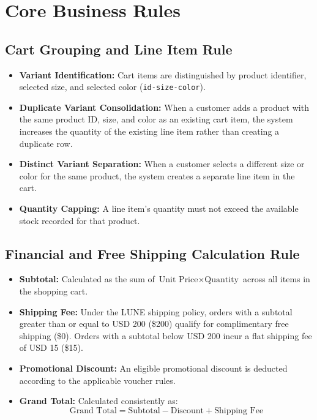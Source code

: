 \documentclass[12pt,a4paper,oneside]{report}
\begin{document}
\section{Core Business Rules}

\subsection{Cart Grouping and Line Item Rule}
\begin{itemize}[leftmargin=1.2cm]
    \item \textbf{Variant Identification:} Cart items are distinguished by product identifier, selected size, and selected color (\texttt{id-size-color}).
    \item \textbf{Duplicate Variant Consolidation:} When a customer adds a product with the same product ID, size, and color as an existing cart item, the system increases the quantity of the existing line item rather than creating a duplicate row.
    \item \textbf{Distinct Variant Separation:} When a customer selects a different size or color for the same product, the system creates a separate line item in the cart.
    \item \textbf{Quantity Capping:} A line item's quantity must not exceed the available stock recorded for that product.
\end{itemize}

\subsection{Financial and Free Shipping Calculation Rule}
\begin{itemize}[leftmargin=1.2cm]
    \item \textbf{Subtotal:} Calculated as the sum of $\text{Unit Price} \times \text{Quantity}$ across all items in the shopping cart.
    \item \textbf{Shipping Fee:} Under the LUNE shipping policy, orders with a subtotal greater than or equal to USD 200 (\$200) qualify for complimentary free shipping (\$0). Orders with a subtotal below USD 200 incur a flat shipping fee of USD 15 (\$15).
    \item \textbf{Promotional Discount:} An eligible promotional discount is deducted according to the applicable voucher rules.
    \item \textbf{Grand Total:} Calculated consistently as:
    \[ \text{Grand Total} = \text{Subtotal} - \text{Discount} + \text{Shipping Fee} \]
\end{itemize}
\end{document}
